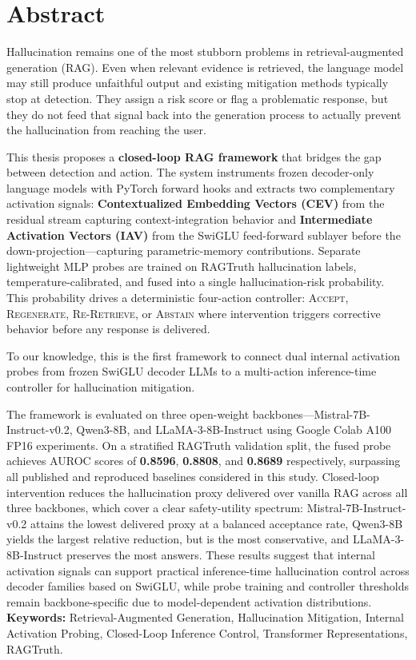 \clearpage
\setcounter{secnumdepth}{-1}
\section{\hfil Abstract \hfil}
\vspace{0.05cm}
\thispagestyle{front}

Hallucination remains one of the most stubborn problems in retrieval-augmented generation (RAG). Even when relevant evidence is retrieved, the language model may still produce unfaithful output and existing mitigation methods typically stop at detection. They assign a risk score or flag a problematic response, but they do not feed that signal back into the generation process to actually prevent the hallucination from reaching the user.

This thesis proposes a \textbf{closed-loop RAG framework} that bridges the gap between detection and action. The system instruments frozen decoder-only language models with PyTorch forward hooks and extracts two complementary activation signals: \textbf{Contextualized Embedding Vectors (CEV)} from the residual stream capturing context-integration behavior and \textbf{Intermediate Activation Vectors (IAV)} from the SwiGLU feed-forward sublayer before the down-projection---capturing parametric-memory contributions. Separate lightweight MLP probes are trained on RAGTruth hallucination labels, temperature-calibrated, and fused into a single hallucination-risk probability. This probability drives a deterministic four-action controller: \textsc{Accept}, \textsc{Regenerate}, \textsc{Re-Retrieve}, or \textsc{Abstain} where intervention triggers corrective behavior before any response is delivered.

To our knowledge, this is the first framework to connect dual internal activation probes from frozen SwiGLU decoder LLMs to a multi-action inference-time controller for hallucination mitigation.

The framework is evaluated on three open-weight backbones---Mistral-7B-Instruct-v0.2, Qwen3-8B, and LLaMA-3-8B-Instruct using Google Colab A100 FP16 experiments. On a stratified RAGTruth validation split, the fused probe achieves AUROC scores of \textbf{0.8596}, \textbf{0.8808}, and \textbf{0.8689} respectively, surpassing all published and reproduced baselines considered in this study. Closed-loop intervention reduces the hallucination proxy delivered over vanilla RAG across all three backbones, which cover a clear safety-utility spectrum: Mistral-7B-Instruct-v0.2 attains the lowest delivered proxy at a balanced acceptance rate, Qwen3-8B yields the largest relative reduction, but is the most conservative, and LLaMA-3-8B-Instruct preserves the most answers.
These results suggest that internal activation signals can support practical inference-time hallucination control across decoder families based on SwiGLU, while probe training and controller thresholds remain backbone-specific due to model-dependent activation distributions.
\\
\textbf{Keywords:} Retrieval-Augmented Generation, Hallucination Mitigation, Internal Activation Probing, Closed-Loop Inference Control, Transformer Representations, RAGTruth.

\setcounter{secnumdepth}{1}
\clearpage
